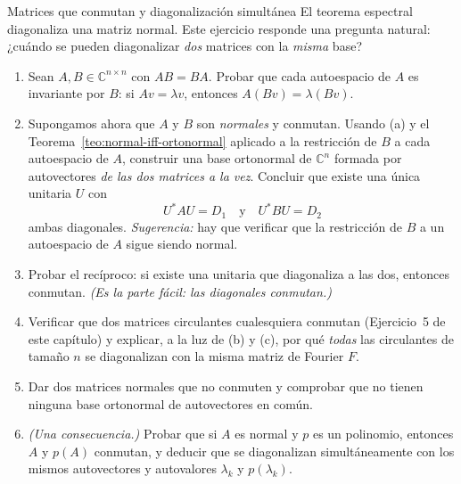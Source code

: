 \begin{entrega}{Matrices que conmutan y diagonalización simultánea}
\label{ent:conmutan}
El teorema espectral diagonaliza una matriz normal. Este ejercicio responde una pregunta
natural: ¿cuándo se pueden diagonalizar \emph{dos} matrices con la \emph{misma} base?

\begin{enumerate}[label=\textbf{(\alph*)},itemsep=3pt,topsep=4pt]
\item Sean $A,B\in\mathbb{C}^{n\times n}$ con $AB=BA$. Probar que cada autoespacio de
$A$ es invariante por $B$: si $Av=\lambda v$, entonces $A(Bv)=\lambda(Bv)$.

\item Supongamos ahora que $A$ y $B$ son \emph{normales} y conmutan. Usando (a) y el
Teorema~\ref{teo:normal-iff-ortonormal} aplicado a la restricción de $B$ a cada
autoespacio de $A$, construir una base ortonormal de $\mathbb{C}^{n}$ formada por
autovectores \emph{de las dos matrices a la vez}. Concluir que existe una única unitaria
$U$ con
\[
U^{*}AU=D_1 \quad\text{y}\quad U^{*}BU=D_2
\]
ambas diagonales. \emph{Sugerencia:} hay que verificar que la restricción de $B$ a un
autoespacio de $A$ sigue siendo normal.

\item Probar el recíproco: si existe una unitaria que diagonaliza a las dos, entonces
conmutan. \emph{(Es la parte fácil: las diagonales conmutan.)}

\item Verificar que dos matrices circulantes cualesquiera conmutan (Ejercicio~5 de este
capítulo) y explicar, a la luz de (b) y (c), por qué \emph{todas} las circulantes de
tamaño $n$ se diagonalizan con la misma matriz de Fourier $F$.

\item Dar dos matrices normales que no conmuten y comprobar que no tienen ninguna base
ortonormal de autovectores en común.

\item \emph{(Una consecuencia.)} Probar que si $A$ es normal y $p$ es un polinomio,
entonces $A$ y $p(A)$ conmutan, y deducir que se diagonalizan simultáneamente con los
mismos autovectores y autovalores $\lambda_k$ y $p(\lambda_k)$.
\end{enumerate}

\medskip
{}
\end{entrega}

